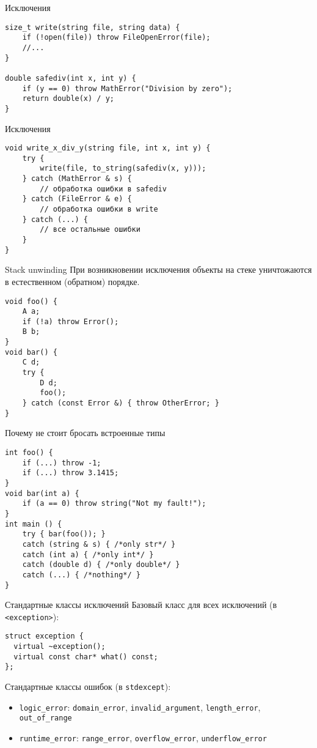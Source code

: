 \documentclass{beamer}
\begin{document}
\begin{frame}[fragile]{Исключения}
\begin{lstlisting}
size_t write(string file, string data) {
    if (!open(file)) throw FileOpenError(file);
    //...
}

double safediv(int x, int y) {
    if (y == 0) throw MathError("Division by zero");
    return double(x) / y;
}
\end{lstlisting}
\end{frame}

\begin{frame}[fragile]{Исключения}
\begin{lstlisting}
void write_x_div_y(string file, int x, int y) {
    try { 
        write(file, to_string(safediv(x, y)));
    } catch (MathError & s) { 
        // обработка ошибки в safediv
    } catch (FileError & e) { 
        // обработка ошибки в write
    } catch (...) {
        // все остальные ошибки
    }
}
\end{lstlisting}
\end{frame}

\begin{frame}[fragile]{Stack unwinding}
При возникновении исключения объекты на стеке
уничтожаются в естественном (обратном) порядке.
\begin{lstlisting}
void foo() {
    A a;
    if (!a) throw Error();
    B b;
}
void bar() {
    C d;
    try {
        D d;
        foo();
    } catch (const Error &) { throw OtherError; }
}
\end{lstlisting}
\end{frame}

\begin{frame}[fragile]{Почему не стоит бросать встроенные типы}
\begin{lstlisting}
int foo() {
    if (...) throw -1;
    if (...) throw 3.1415;
}
void bar(int a) {
    if (a == 0) throw string("Not my fault!");
}
int main () {
    try { bar(foo()); }
    catch (string & s) { /*only str*/ }
    catch (int a) { /*only int*/ }
    catch (double d) { /*only double*/ }
    catch (...) { /*nothing*/ }
}
\end{lstlisting}
\end{frame}

\begin{frame}[fragile]{Стандартные классы исключений}
    Базовый класс для всех исключений (в {\tt <exception>}):
    \begin{lstlisting}
struct exception {
  virtual ~exception();
  virtual const char* what() const;
}; 
    \end{lstlisting}

    Стандартные классы ошибок (в {\tt stdexcept}):\\
    \begin{itemize}
        \item {\tt logic\_error}: 
     {\tt domain\_error}, {\tt invalid\_argument}, {\tt length\_error}, {\tt
     out\_of\_range} 
        \item {\tt runtime\_error}: 
        {\tt range\_error},
        {\tt overflow\_error}, 
        {\tt underflow\_error}
    \end{itemize}
\end{frame}
\end{document}
